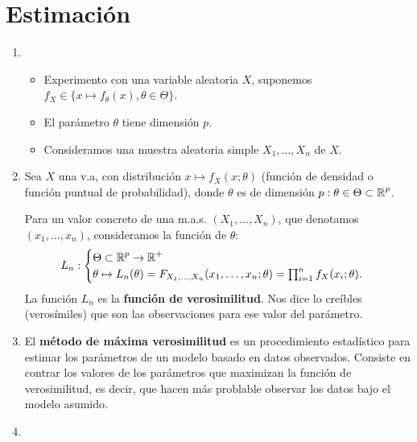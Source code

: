 \section{Estimación}
\begin{enumerate}[label=\color{red}\textbf{\arabic*)}]
  \item {}
    \begin{itemize}[label=\textbullet]
      \item Experimento con una variable aleatoria $X$, suponemos  $f_X\in \{x\mapsto f_\theta(x),\theta\in \Theta\} $.
      \item El parámetro $\theta$ tiene dimensión  $p$.
      \item Consideramos una muestra aleatoria simple  $X_1,\dots,X_n$ de $X$.
    \end{itemize} 
  \item {}

    Sea $X$ una v.a, con distribución  $x\mapsto f_X(x;\theta)$ (función de densidad o función puntual de probabilidad), donde $\theta$ es de dimensión  $p: \theta\in \Theta\subset \operatorname{\mathbb{R}}^p$.

    Para un valor concreto de una m.a.s. $(X_1,\dots,X_n)$, que denotamos $(x_1,\dots,x_n)$, consideramos la función de $\theta$:  \[
    L_n: \begin{cases}
      \Theta\subset \operatorname{\mathbb{R}}^p\to \operatorname{\mathbb{R}}^+\\
      \theta\mapsto L_n(\theta)=F_{X_1,\dots,X_n}(x_1,\dots,x_n;\theta)=\prod_{i=1}^{n} f_X(x_i;\theta).  
    \end{cases}
    \] 
    La función $L_n$ es la  \textbf{función de verosimilitud}. Nos dice lo creíbles (verosímiles) que son las observaciones para ese valor del parámetro. 
  \item {}

    El \textbf{método de máxima verosimilitud} es un procedimiento estadístico para estimar los parámetros de un modelo basado en datos observados. Consiste en contrar los valores de los parámetros que maximizan la función de verosimilitud, es decir, que hacen más problable observar los datos bajo el modelo asumido.
  \item {}


\end{enumerate}
